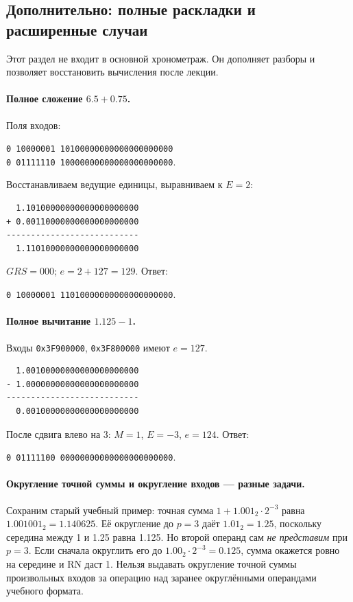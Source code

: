 \newpage
\subsection{Дополнительно: полные раскладки и расширенные случаи}
Этот раздел не входит в основной хронометраж. Он дополняет разборы
и позволяет восстановить вычисления после лекции.

\paragraph{Полное сложение $6.5+0.75$.}
Поля входов:
\begin{center}
\texttt{0 10000001 10100000000000000000000}\\
\texttt{0 01111110 10000000000000000000000}.
\end{center}
Восстанавливаем ведущие единицы, выравниваем к $E=2$:
\begin{verbatim}
  1.10100000000000000000000
+ 0.00110000000000000000000
---------------------------
  1.11010000000000000000000
\end{verbatim}
$GRS=000$; $e=2+127=129$. Ответ:
\begin{center}
\texttt{0 10000001 11010000000000000000000}.
\end{center}

\paragraph{Полное вычитание $1.125-1$.}
Входы \texttt{0x3F900000}, \texttt{0x3F800000} имеют $e=127$.
\begin{verbatim}
  1.00100000000000000000000
- 1.00000000000000000000000
---------------------------
  0.00100000000000000000000
\end{verbatim}
После сдвига влево на 3: $M=1$, $E=-3$, $e=124$.
Ответ:
\begin{center}
\texttt{0 01111100 00000000000000000000000}.
\end{center}

\paragraph{Округление точной суммы и округление входов --- разные задачи.}
Сохраним старый учебный пример: точная сумма $1+1.001_2\cdot2^{-3}$
равна $1.001001_2=1.140625$. Её округление до $p=3$ даёт $1.01_2=1.25$,
поскольку середина между 1 и 1.25 равна 1.125.
Но второй операнд сам \emph{не представим} при $p=3$.
Если сначала округлить его до $1.00_2\cdot2^{-3}=0.125$,
сумма окажется ровно на середине и RN даст 1.
Нельзя выдавать округление точной суммы произвольных входов за
операцию над заранее округлёнными операндами учебного формата.

